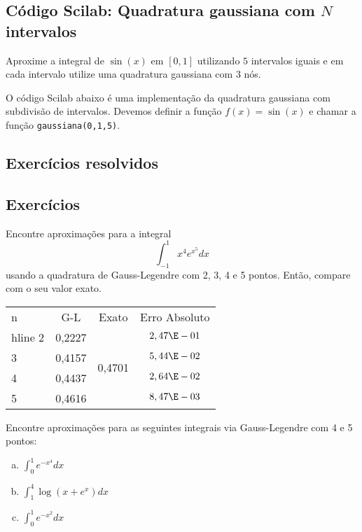 \ifisscilab
\subsection{Código Scilab: Quadratura gaussiana com $N$ intervalos}
\begin{ex}
Aproxime a integral de $\sin(x)$ em $[0,1]$ utilizando $5$ intervalos iguais e em cada intervalo utilize uma quadratura gaussiana com $3$ nós.
\end{ex}

O código Scilab abaixo é uma implementação da quadratura gaussiana com subdivisão de intervalos. Devemos definir a função $f(x)=\sin(x)$ e chamar a função \verb#gaussiana(0,1,5)#.


\fi


\subsection*{Exercícios resolvidos}

\construirExeresol

\subsection*{Exercícios}

\begin{exer}Encontre aproximações para a integral
\begin{equation} \int_{-1}^1 x^4e^{x^5}dx \end{equation}
usando a quadratura de Gauss-Legendre com 2, 3, 4 e 5 pontos. Então, compare com o seu valor exato.
\end{exer}
\begin{resp}
  \begin{center}
    \begin{tabular}{l|ccc}
      n& G-L& Exato& Erro Absoluto\\hline
      2& 0,2227 & \multirow{4}{*}{0,4701} & $2,47\E-01$\\
      3& 0,4157 & & $5,44\E-02$\\
      4& 0,4437 & & $2,64\E-02$\\
      5& 0,4616 & & $8,47\E-03$
    \end{tabular}
  \end{center}
\end{resp}

\begin{exer} Encontre aproximações para as seguintes integrais via Gauss-Legendre com 4 e 5 pontos:
\begin{enumerate}[a)]
\item $\displaystyle \int_0^1 e^{-x^4}dx$
\item $\displaystyle \int_1^4 \log(x+e^x)dx$
\item $\displaystyle \int_0^1 e^{-x^2}dx$
\end{enumerate}
\end{exer}

